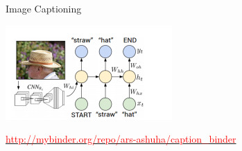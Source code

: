 \documentclass{beamer}
\begin{document}
\begin{frame}{Image Captioning}
	
	\begin{center}
				  \includegraphics[scale=0.7]{img/ic3}
				
				  \href{http://mybinder.org/repo/ars-ashuha/caption_binder}{\textcolor{red}{http://mybinder.org/repo/ars-ashuha/caption\_binder}}
	\end{center}
	


\end{frame}
\end{document}
